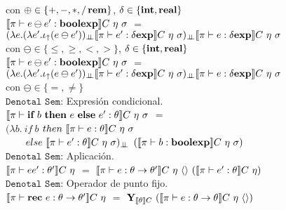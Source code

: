 con $\oplus \in \{ +,-,*,/\,\textbf{rem} \}$, $\delta \in \{\textbf{int},\textbf{real}\}$\\

$\llbracket  \pi \vdash e \ominus e' : \textbf{boolexp}  \rrbracket C \ \eta \ \sigma$ 
$=$ \\
\indent \indent \indent 
$(\lambda e . (\lambda e' . \iota_{\uparrow} (e \ominus e'))_{\bot \!\!\! \bot}
\llbracket \pi \vdash e' : \delta \textbf{exp} \rrbracket C \ \eta \ \sigma)_{\bot \!\!\! \bot}
\llbracket \pi \vdash e : \delta \textbf{exp} \rrbracket C \ \eta \ \sigma$\\

con $\ominus \in \{\leq,\geq,<,> \}$, $\delta \in \{\textbf{int},\textbf{real}\}$\\

$\llbracket  \pi \vdash e \ominus e' : \textbf{boolexp}  \rrbracket C \ \eta \ \sigma$ 
$=$ \\
\indent \indent \indent 
$(\lambda e . (\lambda e' . \iota_{\uparrow} (e \ominus e'))_{\bot \!\!\! \bot}
\llbracket \pi \vdash e' : \delta \textbf{exp} \rrbracket C \ \eta \ \sigma)_{\bot \!\!\! \bot}
\llbracket \pi \vdash e : \delta \textbf{exp} \rrbracket C \ \eta \ \sigma$\\

con $\ominus \in \{=,\neq\}$\\

\noindent
$\texttt{Denotal Sem:}$ Expresi\'on condicional.\\

$\llbracket  \pi \vdash \textbf{if} \ b \ \textbf{then} \ e \ \textbf{else} \ e': \theta  \rrbracket C \ \eta \ \sigma$ 
$=$ \\
\indent \indent \indent 
$(\lambda b . \ if \ b $ $then \ \semBrcks{ \pi \vdash e : \theta}C \ \eta \ \sigma$\\
\indent \indent \indent \indent \indent \ \ \ \
$else \ \llbracket  \pi \vdash e' : \theta \rrbracket C \ \eta \ \sigma)_{\bot \!\!\! \bot}$ 
$(\semBrcks{ \pi \vdash b : \boolexp}C \ \eta \ \sigma)$\\

\noindent
$\texttt{Denotal Sem:}$ Aplicaci\'on.\\

$\semBrcks{ \pi \vdash ee' : \theta' }C \ \eta$ 
$=$ 
$\llbracket  \pi \vdash e : \theta \rightarrow \theta'  \rrbracket C \ \eta \ \langle  \rangle \
(\llbracket  \pi \vdash e' : \theta  \rrbracket C \ \eta)$\\

\noindent
$\texttt{Denotal Sem:}$ Operador de punto fijo.\\

$\llbracket  \pi \vdash \textbf{rec} \ e : \theta \rightarrow \theta'  \rrbracket C \ \eta$ 
$=$ 
$\Y_{\semBrcks{\theta}C} \ 
(\semBrcks{ \pi \vdash e : \theta \rightarrow \theta}C \ \eta \ \lrangles{})$\\

